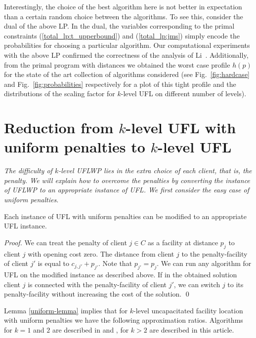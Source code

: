 \documentclass{llncs}
\newcommand{\va}[1]{{\color{black}\sl  #1}}
\begin{document}
Interestingly, the choice of the best algorithm here is not better in expectation than a certain random choice between the algorithms. To see this, consider the dual of the above LP. In the dual, the variables corresponding to the primal constraints (\ref{total_lp:t_upperbound}) and (\ref{total_lp:jms}) simply encode the probabilities for choosing a particular algorithm. Our computational experiments with the above LP confirmed the correctness of the analysis of Li~\cite{ShiLi}. Additionally, from the primal program with distances we obtained the worst case profile $h(p)$ for the state of the art collection of algorithms considered (see Fig.~\ref{fig:hardcase} and Fig.~\ref{fig:probabilities} respectively for a plot of this tight profile and the distributions of the scaling factor for $k$-level UFL on different number of levels).

\section{Reduction from $k$-level UFL with uniform penalties to $k$-level UFL}
\va{The difficulty of $k$-level UFLWP lies in the extra choice of each client, that is, the penalty. 
We will explain how to overcome the penalties by converting the instance of UFLWP to an appropriate instance of UFL. We first consider the easy case of uniform penalties.}
\begin{lemma}
  \label{uniform-lemma}
  Each instance of UFL with uniform penalties can be modified to {an} appropriate UFL instance.
\end{lemma}

\begin{proof}
We can treat the penalty of client $j \in C$ as a facility at distance $p_j$ to client $j$ with opening cost zero. The distance from client $j$ to the penalty-facility of client $j'$ is equal to $c_{j, j'} + p_{j'}$. Note that $p_{j'} = p_{j}$. We can run any algorithm for UFL on the modified instance as described above. If in the obtained solution client $j$ is connected with the penalty-facility of client $j'$, we can switch $j$ to {its} penalty-facility without increasing the cost of the solution.
\qed
\end{proof}

Lemma \ref{uniform-lemma} implies that for $k$-level uncapacitated facility location with uniform penalties we have the following approximation ratios. Algorithms for $k = 1$ and $2$ are described in \cite{ShiLi} and \cite{Zhang}, for $k>2$ are described in this article.
\end{document}

